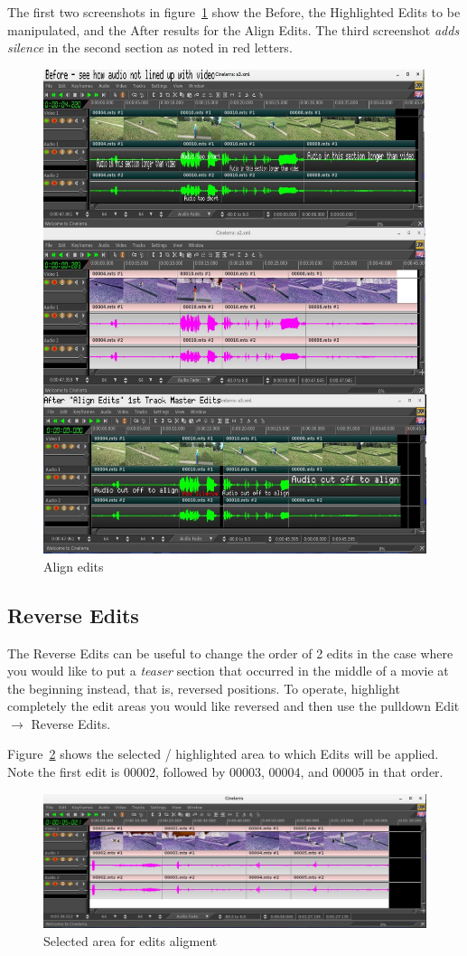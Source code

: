 The first two screenshots in figure~\ref{fig:align} show the Before, the Highlighted Edits to be manipulated, and the After results for the Align Edits. The third screenshot \textit{adds silence} in the second section as noted in red letters.
\begin{figure}[htpb]
    \centering
    \includegraphics[width=0.8\linewidth]{images/align.png}
    \caption{Align edits}
    \label{fig:align}
\end{figure}

\subsection{Reverse Edits}%
\label{sub:reverse_edits}

The Reverse Edits can be useful to change the order of 2 edits in the case where you would like to put a \textit{teaser} section that occurred in the middle of a movie at the beginning instead, that is, reversed positions.  To operate, highlight completely the edit areas you would like reversed and then use the pulldown Edit $\rightarrow$ Reverse Edits.

Figure~\ref{fig:reverse01} shows the selected / highlighted area to which Edits will be applied.  Note the first edit is 00002, followed by 00003, 00004, and 00005 in that order.
\begin{figure}[htpb]
    \centering
    \includegraphics[width=0.8\linewidth]{images/reverse01.png}
    \caption{Selected area for edits aligment}
    \label{fig:reverse01}
\end{figure}

